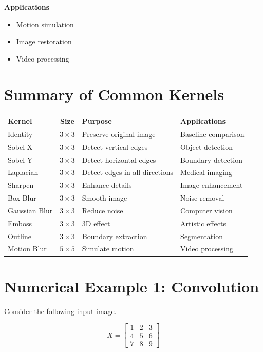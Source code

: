 \documentclass[12pt,a4paper]{article}
\begin{document}
\textbf{Applications}

\begin{itemize}
    \item Motion simulation
    \item Image restoration
    \item Video processing
\end{itemize}

\section*{Summary of Common Kernels}

\begin{center}
\begin{tabular}{|l|c|l|l|}
\hline
\textbf{Kernel} & \textbf{Size} & \textbf{Purpose} & \textbf{Applications}\\
\hline
Identity & $3\times3$ & Preserve original image & Baseline comparison \\
\hline
Sobel-X & $3\times3$ & Detect vertical edges & Object detection \\
\hline
Sobel-Y & $3\times3$ & Detect horizontal edges & Boundary detection \\
\hline
Laplacian & $3\times3$ & Detect edges in all directions & Medical imaging \\
\hline
Sharpen & $3\times3$ & Enhance details & Image enhancement \\
\hline
Box Blur & $3\times3$ & Smooth image & Noise removal \\
\hline
Gaussian Blur & $3\times3$ & Reduce noise & Computer vision \\
\hline
Emboss & $3\times3$ & 3D effect & Artistic effects \\
\hline
Outline & $3\times3$ & Boundary extraction & Segmentation \\
\hline
Motion Blur & $5\times5$ & Simulate motion & Video processing \\
\hline
\end{tabular}
\end{center}

\section{Numerical Example 1: Convolution}

Consider the following input image.

\[
X=
\begin{bmatrix}
1&2&3\\
4&5&6\\
7&8&9
\end{bmatrix}
\]
\end{document}
